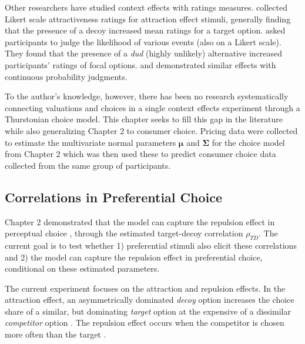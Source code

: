 Other researchers have studied context effects with ratings measures. \textcite{wedellUsingJudgmentsUnderstand} collected Likert scale attractiveness ratings for attraction effect stimuli, generally finding that the presence of a decoy increased mean ratings for a target option. \textcite{windschitl2004dud} asked participants to judge the likelihood of various events (also on a Likert scale). They found that the presence of a \textit{dud} (highly unlikely) alternative increased participants' ratings of focal options. \textcite{caiWhenAlternativeHypotheses2023} and \textcite{fang2024context} demonstrated similar effects with continuous probability judgments.

To the author's knowledge, however, there has been no research systematically connecting valuations and choices in a single context effects experiment through a Thurstonian choice model. This chapter seeks to fill this gap in the literature while also generalizing Chapter 2 to consumer choice. Pricing data were collected to estimate the multivariate normal parameters $\boldsymbol{\mu}$ and $\boldsymbol{\Sigma}$ for the choice model from Chapter 2 which was then used these to predict consumer choice data collected from the same group of participants.

\subsection{Correlations in Preferential Choice}
Chapter 2 demonstrated that the model can capture the repulsion effect in perceptual choice \parencite{spektorWhenGoodLooks2018b}, through the estimated target-decoy correlation $\rho_{TD}$. The current goal is to test whether 1) preferential stimuli also elicit these correlations and 2) the model can capture the repulsion effect in preferential choice, conditional on these estimated parameters. 

The current experiment focuses on the attraction and repulsion effects. In the attraction effect, an asymmetrically dominated \textit{decoy} option increases the choice share of a similar, but dominating \textit{target} option at the expensive of a dissimilar \textit{competitor} option \parencite{huberAddingAsymmetricallyDominated1982d}. The repulsion effect occurs when the competitor is chosen more often than the target \parencite{simonson2014vices}. 

